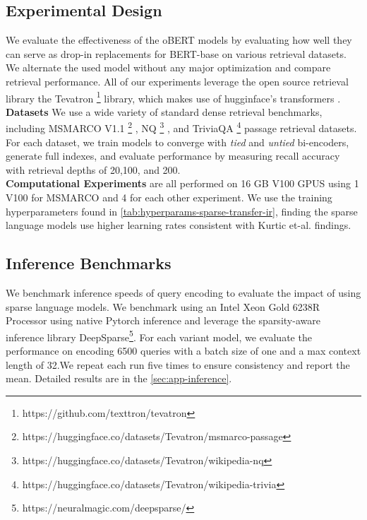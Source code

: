 \documentclass[11pt]{article}
\begin{document}
\subsection{Experimental Design}
We evaluate the effectiveness of the oBERT models by evaluating how well they can serve as drop-in replacements for BERT-base on various retrieval datasets. We alternate the used model without any major optimization and compare retrieval performance. All of our experiments leverage the open source retrieval library the Tevatron \cite{Gao2022TevatronAE} \footnote{https://github.com/texttron/tevatron} library, which makes use of hugginface's transformers \cite{wolf-etal-2020-transformers}.\\
\textbf{Datasets} We use a wide variety of standard dense retrieval benchmarks, including MSMARCO V1.1 \footnote{https://huggingface.co/datasets/Tevatron/msmarco-passage} \cite{Campos2016MSMA}, NQ \footnote{https://huggingface.co/datasets/Tevatron/wikipedia-nq} \cite{Kwiatkowski2019NaturalQA}, and TriviaQA \footnote{https://huggingface.co/datasets/Tevatron/wikipedia-trivia} \cite{Joshi2017TriviaQAAL} passage retrieval datasets.  \\
For each dataset, we train models to converge with \textit{tied} and \textit{untied} bi-encoders, generate full indexes, and evaluate performance by measuring recall accuracy with retrieval depths of 20,100, and 200. \\
\textbf{Computational Experiments} are all performed on 16 GB V100 GPUS using 1 V100 for MSMARCO and 4 for each other experiment. We use the training hyperparameters found in \ref{tab:hyperparams-sparse-transfer-ir}, finding the sparse language models use higher learning rates consistent with Kurtic et-al. \cite{Kurti2022TheOB} findings.
\subsection{Inference Benchmarks}
We benchmark inference speeds of query encoding to evaluate the impact of using sparse language models. We benchmark using an Intel Xeon Gold 6238R Processor using native Pytorch inference and leverage the sparsity-aware inference library DeepSparse\footnote{https://neuralmagic.com/deepsparse/}. For each variant model, we evaluate the performance on encoding 6500 queries with a batch size of one and a max context length of 32.We repeat each run five times to ensure consistency and report the mean. Detailed results are in the \ref{sec:app-inference}.
\end{document}
